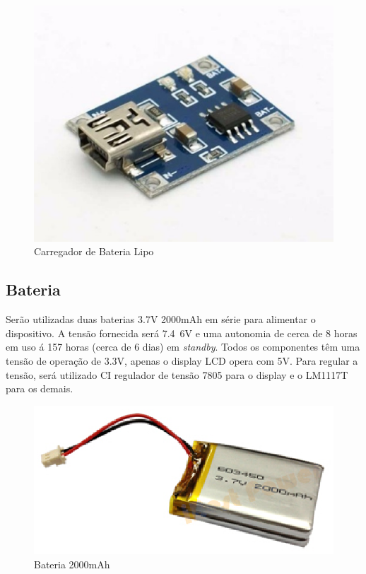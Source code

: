 \begin{figure}[!ht]
  \centering
  \includegraphics[keepaspectratio=true,scale=0.45]{figuras/carregador.eps}
  \caption{Carregador de Bateria Lipo}
\end{figure}

\subsection{Bateria}
Serão utilizadas duas baterias 3.7V 2000mAh em série para alimentar o dispositivo. A tensão fornecida será 7.4~6V e uma autonomia de cerca de 8 horas em uso á 157 horas (cerca de 6 dias) em \textit{standby}. Todos os componentes têm uma tensão de operação de 3.3V, apenas o display LCD opera com 5V. Para regular a tensão, será utilizado CI regulador de tensão 7805 para o display e o LM1117T para os demais.

\begin{figure}[!ht]
  \centering
  \includegraphics[keepaspectratio=true,scale=0.7]{figuras/bateria.eps}
  \caption{Bateria 2000mAh}
\end{figure}

